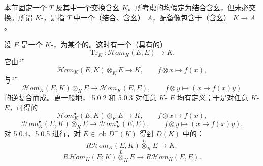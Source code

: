 本节固定一个 $T$ 及其中一个交换含幺 $K$。所考虑的均假定为结合含幺，但未必交换。所谓 $K$-，是指 $T$ 中一个（结合、含幺） $A$，配备像包含于（含幺） $K\to A$。

设 $E$ 是一个 $K$-，为某个的。这时有一个（具有的）
\begin{equation}\operatorname{Tr}_K:\mathcal{H}\!om_K(E,E)\longrightarrow K,\tag{5.0.1}\end{equation}
它由“”
\begin{equation}\mathcal{H}\!om_K(E,K)\otimes_K E\longrightarrow K,\qquad f\otimes x\longmapsto f(x),\tag{5.0.2}\end{equation}
与“”
\begin{equation}\mathcal{H}\!om_K(E,K)\otimes_K E\longrightarrow\mathcal{H}\!om_K(E,E),\qquad f\otimes y\longmapsto(x\longmapsto f(x)y)\tag{5.0.3}\end{equation}
的逆复合而成。更一般地， 5.0.2 和 5.0.3 对任意 $K$- $E$ 均有定义；于是对任意 $K$- $E$，可得的
\begin{equation}\mathcal{H}\!om_K^\bullet(E,K)\otimes_K E\longrightarrow K,\qquad f\otimes x\longmapsto f(x),\tag{5.0.4}\end{equation}
\begin{equation}\mathcal{H}\!om_K^\bullet(E,K)\otimes_K E\longrightarrow\mathcal{H}\!om_K^\bullet(E,E),\qquad f\otimes y\longmapsto(x\longmapsto f(x)y).\tag{5.0.5}\end{equation}
对 5.0.4、5.0.5 进行，对 $E\in\operatorname{ob}D^-(K)$ 得到 $D(K)$ 中的：
\begin{equation}R\mathcal{H}\!om_K(E,K)\overset L\otimes_K E\longrightarrow K,\tag{5.0.6}\end{equation}
\begin{equation}R\mathcal{H}\!om_K(E;K)\overset L\otimes_K E\longrightarrow R\mathcal{H}\!om_K(E,E).\tag{5.0.7}\end{equation}

